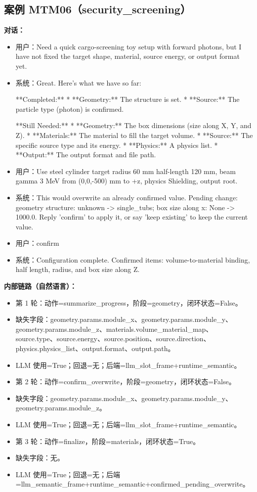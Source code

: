 \documentclass[11pt]{ctexart}
\begin{document}
\subsection{案例 MTM06（security\_screening）}
\textbf{对话：}
\begin{itemize}
\item 用户：Need a quick cargo-screening toy setup with forward photons, but I have not fixed the target shape, material, source energy, or output format yet.
\item 系统：Great. Here's what we have so far:

**Completed:**
*   **Geometry:** The structure is set.
*   **Source:** The particle type (photon) is confirmed.

**Still Needed:**
*   **Geometry:** The box dimensions (size along X, Y, and Z).
*   **Materials:** The material to fill the target volume.
*   **Source:** The specific source type and its energy.
*   **Physics:** A physics list.
*   **Output:** The output format and file path.
\item 用户：Use steel cylinder target radius 60 mm half-length 120 mm, beam gamma 3 MeV from (0,0,-500) mm to +z, physics Shielding, output root.
\item 系统：This would overwrite an already confirmed value. Pending change: geometry structure: unknown -> single\_tubs; box size along x: None -> 1000.0. Reply 'confirm' to apply it, or say 'keep existing' to keep the current value.
\item 用户：confirm
\item 系统：Configuration complete. Confirmed items: volume-to-material binding, half length, radius, and box size along Z.
\end{itemize}
\textbf{内部链路（自然语言）：}
\begin{itemize}
\item 第 1 轮：动作=summarize\_progress，阶段=geometry，闭环状态=False。
\item 缺失字段：geometry.params.module\_x、geometry.params.module\_y、geometry.params.module\_z、materials.volume\_material\_map、source.type、source.energy、source.position、source.direction、physics.physics\_list、output.format、output.path。
\item LLM 使用=True；回退=无；后端=llm\_slot\_frame+runtime\_semantic。
\item 第 2 轮：动作=confirm\_overwrite，阶段=geometry，闭环状态=False。
\item 缺失字段：geometry.params.module\_x、geometry.params.module\_y、geometry.params.module\_z。
\item LLM 使用=True；回退=无；后端=llm\_slot\_frame+runtime\_semantic。
\item 第 3 轮：动作=finalize，阶段=materials，闭环状态=True。
\item 缺失字段：无。
\item LLM 使用=True；回退=无；后端=llm\_semantic\_frame+runtime\_semantic+confirmed\_pending\_overwrite。
\end{itemize}
\end{document}
